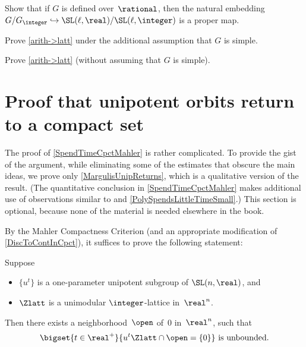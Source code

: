 \begin{exercises}
\item \label{ProperMapToSLnR/SLnZPfEx}
Show that if $G$ is defined over~$\rational$, then the natural embedding $G/G_{\integer} \hookrightarrow \SL(\ell,\real)/\SL(\ell,\integer)$ is a proper map.

\item \label{GZLattSimpleEx}
Prove \cref{arith->latt} under the additional assumption that $G$ is simple.

\item \label{GZLattEx}
Prove \cref{arith->latt} (without assuming that $G$ is simple).

\end{exercises}








\section{Proof that unipotent orbits return to a compact set} \label{PfUnipOrbitsReturnSect}

The proof of \cref{SpendTimeCpctMahler} is rather complicated. To provide the gist of the argument, while eliminating some of the estimates that obscure the main ideas, we prove only \cref{MargulisUnipReturns}, which is a qualitative version of the result. (The quantitative conclusion in \cref{SpendTimeCpctMahler} makes additional use of observations similar to  and \cref{PolySpendsLittleTimeSmall}.) 
This section is optional, because none of the material is needed elsewhere in the book.

By the Mahler Compactness Criterion (and an appropriate modification of \cref{DiscToContInCpct}), it suffices to prove the following statement:

\begin{thm} \label{UnipOrbMissNeigh}
Suppose
	\begin{itemize}
	\item $\{u^t\}$ is a one-parameter unipotent subgroup of\/ $\SL(n,\real)$,
	and
	\item $\Zlatt$ is a unimodular $\integer$-lattice in\/~$\real^n$.
	\end{itemize}
Then there exists a neighborhood~$\open$ of\/~$0$ in\/~$\real^n$, such that
	$$ \text{$\bigset{ t \in \real^+ }{ u^t \Zlatt \cap \open = \{0\} }$ is unbounded.} $$
\end{thm}

